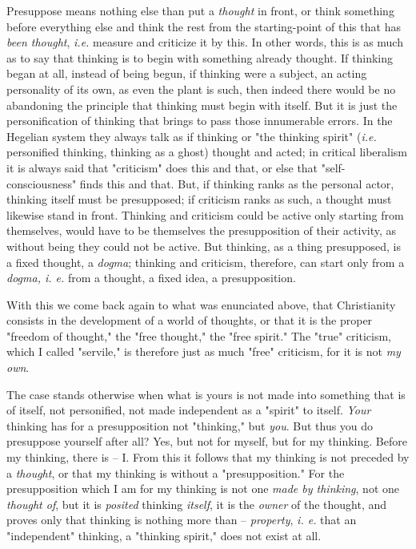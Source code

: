 Presuppose means nothing else than put a \textit{thought} in front, or think 
something before everything else and think the rest from the starting-point of 
this that has \textit{been thought}, \textit{i.e.} measure and criticize it by 
this. In other words, this is as much as to say that thinking is to begin with 
something already thought. If thinking began at all, instead of being begun, 
if thinking were a subject, an acting personality of its own, as even the 
plant is such, then indeed there would be no abandoning the principle that 
thinking must begin with itself. But it is just the personification of 
thinking that brings to pass those innumerable errors. In the Hegelian system 
they always talk as if thinking or "{}the thinking spirit"{} (\textit{i.e.} 
personified thinking, thinking as a ghost) thought and acted; in critical 
liberalism it is always said that "{}criticism"{} does this and that, or else 
that "{}self- consciousness"{} finds this and that. But, if thinking ranks as 
the personal actor, thinking itself must be presupposed; if criticism ranks as 
such, a thought must likewise stand in front. Thinking and criticism could be 
active only starting from themselves, would have to be themselves the 
presupposition of their activity, as without being they could not be active. 
But thinking, as a thing presupposed, is a fixed thought, a \textit{dogma}; 
thinking and criticism, therefore, can start only from a \textit{dogma, i. e.} 
from a thought, a fixed idea, a presupposition.

With this we come back again to what was enunciated above, that Christianity 
consists in the development of a world of thoughts, or that it is the proper 
"{}freedom of thought,"{} the "{}free thought,"{} the "{}free spirit."{} The 
"{}true"{} criticism, which I called "{}servile,"{} is therefore just as much 
"{}free"{} criticism, for it is not \textit{my own}.

The case stands otherwise when what is yours is not made into something that 
is of itself, not personified, not made independent as a "{}spirit"{} to 
itself. \textit{Your} thinking has for a presupposition not "{}thinking,"{} 
but \textit{you}. But thus you do presuppose yourself after all? Yes, but not 
for myself, but for my thinking. Before my thinking, there is -- I. From this 
it follows that my thinking is not preceded by a \textit{thought}, or that my 
thinking is without a "{}presupposition."{} For the presupposition which I am 
for my thinking is not one \textit{made by thinking}, not one \textit{thought 
of}, but it is \textit{posited} thinking \textit{itself}, it is the 
\textit{owner} of the thought, and proves only that thinking is nothing more 
than -- \textit{property}, \textit{i. e.} that an "{}independent"{} thinking, 
a "{}thinking spirit,"{} does not exist at all.

